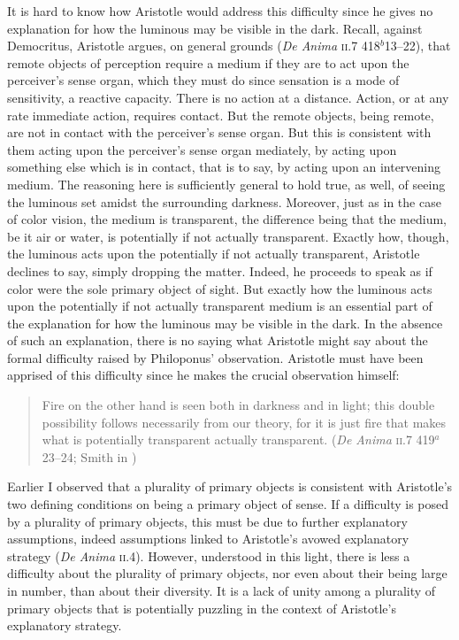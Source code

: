 It is hard to know how Aristotle would address this difficulty since he gives no explanation for how the luminous may be visible in the dark. Recall, against Democritus, Aristotle argues, on general grounds (\emph{De Anima} \textsc{ii}.7 418\( ^{b} \)13--22), that remote objects of perception require a medium if they are to act upon the perceiver's sense organ, which they must do since sensation is a mode of sensitivity, a reactive capacity. There is no action at a distance. Action, or at any rate immediate action, requires contact. But the remote objects, being remote, are not in contact with the perceiver's sense organ. But this is consistent with them acting upon the perceiver's sense organ mediately, by acting upon something else which is in contact, that is to say, by acting upon an intervening medium. The reasoning here is sufficiently general to hold true, as well, of seeing the luminous set amidst the surrounding darkness. Moreover, just as in the case of color vision, the medium is transparent, the difference being that the medium, be it air or water, is potentially if not actually transparent. Exactly how, though, the luminous acts upon the potentially if not actually transparent, Aristotle declines to say, simply dropping the matter. Indeed, he proceeds to speak as if color were the sole primary object of sight. But exactly how the luminous acts upon the potentially if not actually transparent medium is an essential part of the explanation for how the luminous may be visible in the dark. In the absence of such an explanation, there is no saying what Aristotle might say about the formal difficulty raised by Philoponus' observation. Aristotle must have been apprised of this difficulty since he makes the crucial observation himself:
\begin{quote}
	Fire on the other hand is seen both in darkness and in light; this double possibility follows necessarily from our theory, for it is just fire that makes what is potentially transparent actually transparent. (\emph{De Anima} \textsc{ii}.7 419\( ^{a} \)23--24; Smith in \citealt[34]{Barnes:1984uq})
\end{quote}

Earlier I observed that a plurality of primary objects is consistent with Aristotle's two defining conditions on being a primary object of sense. If a difficulty is posed by a plurality of primary objects, this must be due to further explanatory assumptions, indeed assumptions linked to Aristotle's avowed explanatory strategy (\emph{De Anima} \textsc{ii}.4). However, understood in this light, there is less a difficulty about the plurality of primary objects, nor even about their being large in number, than about their diversity. It is a lack of unity among a plurality of primary objects that is potentially puzzling in the context of Aristotle's explanatory strategy. 

